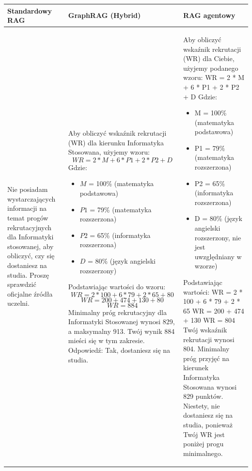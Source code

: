 \noindent
\begin{tabularx}{\textwidth}{@{} >{\raggedright\arraybackslash}X >{\raggedright\arraybackslash}X >{\raggedright\arraybackslash}X @{}}
    \toprule
    \textbf{Standardowy RAG} & \textbf{GraphRAG (Hybrid)} & \textbf{RAG agentowy} \\
    \midrule
    \footnotesize Nie posiadam wystarczających informacji na temat progów rekrutacyjnych dla Informatyki stosowanej, aby obliczyć, czy się dostaniesz na studia. Proszę sprawdzić oficjalne źródła uczelni. & \begin{minipage}[t]{\linewidth}\footnotesize Aby obliczyć wskaźnik rekrutacji (WR) dla kierunku Informatyka Stosowana, użyjemy wzoru:
\[ WR = 2 * M + 6 * P1 + 2 * P2 + D \]
Gdzie:
\begin{itemize}
\item \( M \) = 100\% (matematyka podstawowa)
\item \( P1 \) = 79\% (matematyka rozszerzona)
\item \( P2 \) = 65\% (informatyka rozszerzona)
\item \( D \) = 80\% (język angielski rozszerzony)
\end{itemize}
Podstawiając wartości do wzoru:
\[ WR = 2 * 100 + 6 * 79 + 2 * 65 + 80 \]
\[ WR = 200 + 474 + 130 + 80 \]
\[ WR = 884 \]
Minimalny próg rekrutacyjny dla Informatyki Stosowanej wynosi 829, a maksymalny 913. Twój wynik 884 mieści się w tym zakresie.
Odpowiedź: Tak, dostaniesz się na studia.\end{minipage} & \begin{minipage}[t]{\linewidth}\footnotesize Aby obliczyć wskaźnik rekrutacji (WR) dla Ciebie, użyjemy podanego wzoru:
WR = 2 * M + 6 * P1 + 2 * P2 + D
Gdzie:
\begin{itemize}
\item M = 100\% (matematyka podstawowa)
\item P1 = 79\% (matematyka rozszerzona)
\item P2 = 65\% (informatyka rozszerzona)
\item D = 80\% (język angielski rozszerzony, nie jest uwzględniany w wzorze)
\end{itemize}
Podstawiając wartości:
WR = 2 * 100 + 6 * 79 + 2 * 65
WR = 200 + 474 + 130
WR = 804
Twój wskaźnik rekrutacji wynosi 804.
Minimalny próg przyjęć na kierunek Informatyka Stosowana wynosi 829 punktów. Niestety, nie dostaniesz się na studia, ponieważ Twój WR jest poniżej progu minimalnego.\end{minipage} \\
    \bottomrule
\end{tabularx}

